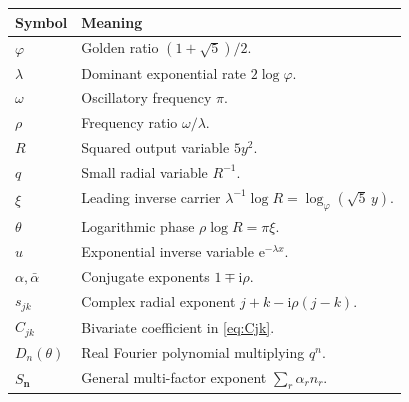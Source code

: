 \documentclass[11pt,oneside]{article}
\numberwithin{equation}{section}
\theoremstyle{plain}
\theoremstyle{definition}
\theoremstyle{remark}
\newcommand{\e}{\mathrm e}
\newcommand{\ii}{\mathrm i}
\newcommand{\multi}[1]{\bm{#1}}
\begin{document}
\begin{longtable}{@{}p{}p{}@{}}
\toprule
Symbol & Meaning\\
\midrule
\endhead
\(\varphi\) & Golden ratio \((1+\sqrt5)/2\).\\
\(\lambda\) & Dominant exponential rate \(2\log\varphi\).\\
\(\omega\) & Oscillatory frequency \(\pi\).\\
\(\rho\) & Frequency ratio \(\omega/\lambda\).\\
\(R\) & Squared output variable \(5y^2\).\\
\(q\) & Small radial variable \(R^{-1}\).\\
\(\xi\) & Leading inverse carrier \(\lambda^{-1}\log R
=\log_{\varphi}(\sqrt5\,y)\).\\
\(\theta\) & Logarithmic phase \(\rho\log R=\pi\xi\).\\
\(u\) & Exponential inverse variable \(\e^{-\lambda x}\).\\
\(\alpha,\bar\alpha\) & Conjugate exponents \(1\mp\ii\rho\).\\
\(s_{jk}\) & Complex radial exponent \(j+k-\ii\rho(j-k)\).\\
\(C_{jk}\) & Bivariate coefficient in \cref{eq:Cjk}.\\
\(D_n(\theta)\) & Real Fourier polynomial multiplying \(q^n\).\\
\(S_{\multi n}\) & General multi-factor exponent
\(\sum_r\alpha_rn_r\).\\
\bottomrule
\end{longtable}
\end{document}
